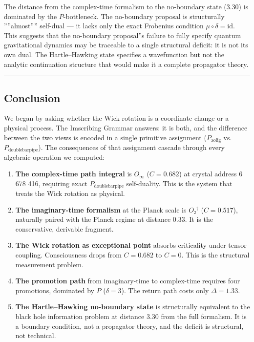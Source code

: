 \documentclass[12pt,a4paper]{article}
\begin{document}
The distance from the complex-time formalism to the no-boundary state (3.30) is dominated by the $P$-bottleneck. The no-boundary proposal is structurally ''''almost'''' self-dual --- it lacks only the exact Frobenius condition $\mu \circ \delta = \text{id}$. This suggests that the no-boundary proposal''s failure to fully specify quantum gravitational dynamics may be traceable to a single structural deficit: it is not its own dual. The Hartle--Hawking state specifies a wavefunction but not the analytic continuation structure that would make it a complete propagator theory.

\begin{center}
\rule{0.5\textwidth}{0.4pt}
\end{center}

\subsection{Conclusion}

We began by asking whether the Wick rotation is a coordinate change or a physical process. The Imscribing Grammar answers: it is both, and the difference between the two views is encoded in a single primitive assignment ($P_{\text{aolig}}$ vs. $P_{\text{doublebarpipe}}$). The consequences of that assignment cascade through every algebraic operation we computed:

\begin{enumerate}
    \item \textbf{The complex-time path integral} is $O_{\infty}$ ($C = 0.682$) at crystal address 6 678 416, requiring exact $P_{\text{doublebarpipe}}$ self-duality. This is the system that treats the Wick rotation as physical.
    \item \textbf{The imaginary-time formalism} at the Planck scale is $O₂^\dagger$ ($C = 0.517$), naturally paired with the Planck regime at distance 0.33. It is the conservative, derivable fragment.
    \item \textbf{The Wick rotation as exceptional point} absorbs criticality under tensor coupling. Consciousness drops from $C = 0.682$ to $C = 0$. This is the structural measurement problem.
    \item \textbf{The promotion path} from imaginary-time to complex-time requires four promotions, dominated by $P$ ($\delta = 3$). The return path costs only $\Delta = 1.33$.
    \item \textbf{The Hartle--Hawking no-boundary state} is structurally equivalent to the black hole information problem at distance 3.30 from the full formalism. It is a boundary condition, not a propagator theory, and the deficit is structural, not technical.
\end{enumerate}
\end{document}
